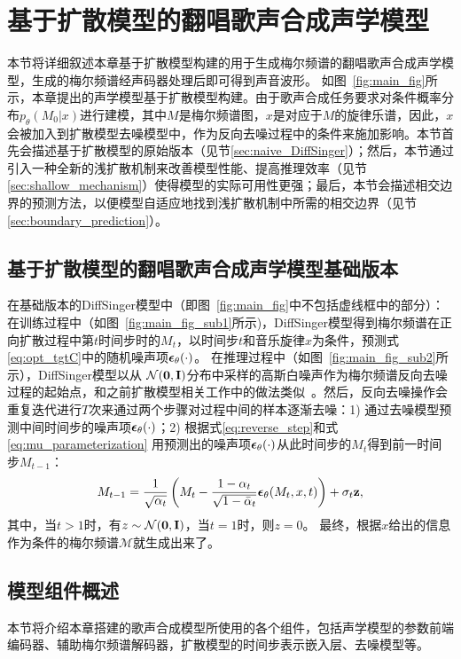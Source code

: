 \section{基于扩散模型的翻唱歌声合成声学模型}
本节将详细叙述本章基于扩散模型构建的用于生成梅尔频谱的翻唱歌声合成声学模型，生成的梅尔频谱经声码器处理后即可得到声音波形。
如图~\ref{fig:main_fig}所示，本章提出的声学模型基于扩散模型构建。由于歌声合成任务要求对条件概率分布$p_\theta(M_{0}|x)$进行建模，其中$M$是梅尔频谱图，$x$是对应于$M$的旋律乐谱，因此，$x$会被加入到扩散模型去噪模型中，作为反向去噪过程中的条件来施加影响。本节首先会描述基于扩散模型的原始版本（见节\ref{sec:naive_DiffSinger}）；然后，本节通过引入一种全新的浅扩散机制来改善模型性能、提高推理效率（见节\ref{sec:shallow_mechanism}）使得模型的实际可用性更强；最后，本节会描述相交边界的预测方法，以便模型自适应地找到浅扩散机制中所需的相交边界（见节\ref{sec:boundary_prediction}）。
\subsection{基于扩散模型的翻唱歌声合成声学模型基础版本}
\label{sec:naive_diffsinger}
在基础版本的DiffSinger模型中（即图~\ref{fig:main_fig}中不包括虚线框中的部分）：在训练过程中（如图~\ref{fig:main_fig_sub1}所示)，DiffSinger模型得到梅尔频谱在正向扩散过程中第$t$时间步时的$M_t$，以时间步$t$和音乐旋律$x$为条件，预测式\eqref{eq:opt_tgtC}中的随机噪声项${\boldsymbol{\epsilon}}_\theta(\cdot)$。 在推理过程中（如图~\ref{fig:main_fig_sub2}所示），DiffSinger模型以从
$\mathcal{N}(\mathbf{0}, \mathbf{I})$分布中采样的高斯白噪声作为梅尔频谱反向去噪过程的起始点，和之前扩散模型相关工作中的做法类似~\citep{Ho2020ddpm,kong2021diffwave}。然后，反向去噪操作会重复迭代进行$T$次来通过两个步骤对过程中间的样本逐渐去噪：1) 通过去噪模型预测中间时间步的噪声项${\boldsymbol{\epsilon}}_\theta(\cdot)$；2) 根据式\eqref{eq:reverse_step}和式\eqref{eq:mu_parameterization}
用预测出的噪声项${\boldsymbol{\epsilon}}_\theta(\cdot)$从此时间步的$M_t$得到前一时间步$M_{t-1}$：
\begin{equation}
    M_{t-1} = \frac{1}{\sqrt{\alpha_t}}\left( M_t - \frac{1-\alpha_t}{\sqrt{1-\bar\alpha_t}} {\boldsymbol{\epsilon}}_\theta(M_t, x, t) \right) + \sigma_t \mathbf{z},
\end{equation}
其中，当$t>1$时，有$z\sim\mathcal{N}(\mathbf{0}, \mathbf{I})$，当$t=1$时，则$z=0$。
最终，根据$x$给出的信息作为条件的梅尔频谱$\mathcal{M}$就生成出来了。
\subsection{模型组件概述}
本节将介绍本章搭建的歌声合成模型所使用的各个组件，包括声学模型的参数前端编码器、辅助梅尔频谱解码器，扩散模型的时间步表示嵌入层、去噪模型等。
